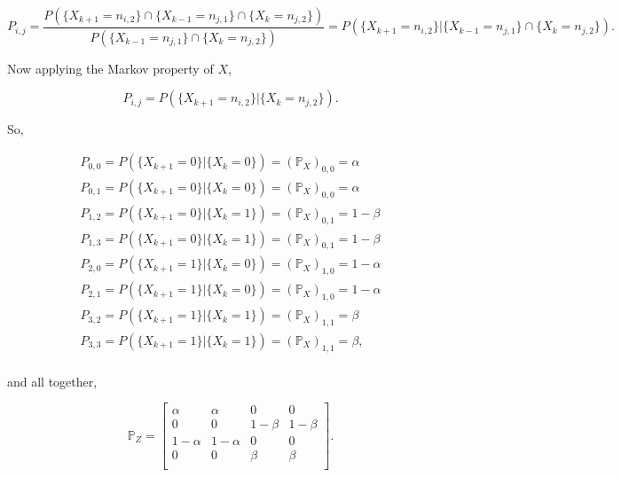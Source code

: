 \documentclass[12pt]{article}
\newcommand{\om}[0] { \omega }
\newcommand{\Om}[0] { \Omega }
\newcommand{ \cf }[1] { \mathbf{1}_{#1} }
\begin{document}
$$
P_{i,j} =  \frac{ P( \{ X_{k+1} = n_{i,2} \} \cap \{ X_{k-1} = n_{j,1} \} \cap \{ X_k = n_{j,2} \}  ) }{ P( \{ X_{k-1} = n_{j,1} \} \cap \{ X_k = n_{j,2} \}  ) } = P( \{ X_{k+1} = n_{i,2} \} | \{ X_{k-1} = n_{j,1} \} \cap \{ X_k = n_{j,2} \} ).
$$

\noindent
Now applying the Markov property of $X$,

$$
P_{i,j} =  P( \{ X_{k+1} = n_{i,2} \} | \{ X_k = n_{j,2} \} ).
$$

\noindent
So,

$$
\begin{array}{c} 
P_{0,0} = P( \{ X_{k+1} = 0 \} | \{ X_k = 0 \} ) = (\mathbb{P}_X)_{0,0} = \alpha  \\  
P_{0,1} = P( \{ X_{k+1} = 0 \} | \{ X_k = 0 \} ) = (\mathbb{P}_X)_{0,0} =  \alpha  \\  
P_{1,2} = P( \{ X_{k+1} = 0 \} | \{ X_k = 1 \} ) = (\mathbb{P}_X)_{0,1} =  1-\beta  \\  
P_{1,3} = P( \{ X_{k+1} = 0 \} | \{ X_k = 1 \} ) = (\mathbb{P}_X)_{0,1} =  1-\beta  \\  
P_{2,0} = P( \{ X_{k+1} = 1 \} | \{ X_k = 0 \} ) = (\mathbb{P}_X)_{1,0} =  1-\alpha  \\  
P_{2,1} = P( \{ X_{k+1} = 1 \} | \{ X_k = 0 \} ) = (\mathbb{P}_X)_{1,0} =  1-\alpha  \\  
P_{3,2} = P( \{ X_{k+1} = 1 \} | \{ X_k = 1 \} ) = (\mathbb{P}_X)_{1,1} =  \beta  \\  
P_{3,3} = P( \{ X_{k+1} = 1 \} | \{ X_k = 1 \} ) = (\mathbb{P}_X)_{1,1} =  \beta,   \\  
\end{array} 
$$

\noindent
and all together,

$$
\mathbb{P}_Z = \left[ \begin{array}{cccc} 
\alpha  & \alpha  & 0 & 0 \\
0 & 0 & 1-\beta  & 1-\beta  \\
1-\alpha & 1-\alpha & 0 & 0 \\
0 & 0 & \beta & \beta \\
\end{array} \right].
$$





\end{document}
